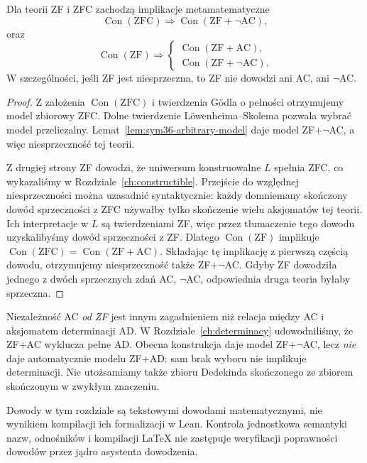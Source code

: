 \begin{twierdzenie}
\label{thm:sym36-relative-consistency}
Dla teorii ZF i ZFC zachodzą implikacje
metamatematyczne
\[
 \operatorname{Con}(\mathrm{ZFC})
 \Longrightarrow
 \operatorname{Con}(\mathrm{ZF}+\neg\mathrm{AC}),
\]
oraz
\[
 \operatorname{Con}(\mathrm{ZF})
 \Longrightarrow
 \begin{cases}
 \operatorname{Con}(\mathrm{ZF}+\mathrm{AC}),\\
 \operatorname{Con}(\mathrm{ZF}+\neg\mathrm{AC}).
 \end{cases}
\]
W szczególności, jeśli ZF jest niesprzeczna,
to ZF nie dowodzi ani AC, ani $\neg$AC.
\end{twierdzenie}
\begin{proof}
Z założenia $\operatorname{Con}(\mathrm{ZFC})$
i twierdzenia Gödla o pełności otrzymujemy
model zbiorowy ZFC. Dolne twierdzenie
Löwenheima--Skolema pozwala wybrać model
przeliczalny. Lemat~\ref{lem:sym36-arbitrary-model}
daje model ZF+$\neg$AC, a więc
niesprzeczność tej teorii.

Z drugiej strony ZF dowodzi, że
uniwersum konstruowalne $L$
spełnia ZFC, co wykazaliśmy w
Rozdziale~\ref{ch:constructible}.
Przejście do względnej niesprzeczności
można uzasadnić syntaktycznie:
każdy domniemany skończony dowód
sprzeczności z ZFC używałby tylko
skończenie wielu aksjomatów tej teorii.
Ich interpretacje w $L$ są twierdzeniami
ZF, więc przez tłumaczenie tego dowodu
uzyskalibyśmy dowód sprzeczności z ZF.
Dlatego $\operatorname{Con}(\mathrm{ZF})$
implikuje
$\operatorname{Con}(\mathrm{ZFC})
=\operatorname{Con}(\mathrm{ZF}+\mathrm{AC})$.
Składając tę implikację z
pierwszą częścią dowodu, otrzymujemy
niesprzeczność także ZF+$\neg$AC.
Gdyby ZF dowodziła jednego z dwóch
sprzecznych zdań AC, $\neg$AC,
odpowiednia druga teoria byłaby sprzeczna.
\end{proof}

\begin{uwaga}
\label{rem:sym36-ac-ad}
Niezależność AC \emph{od ZF} jest innym
zagadnieniem niż relacja między AC i
aksjomatem determinacji AD.
W Rozdziale~\ref{ch:determinacy}
udowodniliśmy, że ZF+AC wyklucza
pełne AD. Obecna konstrukcja daje
model ZF+$\neg$AC, lecz \emph{nie}
daje automatycznie modelu ZF+AD:
sam brak wyboru nie implikuje determinacji.
Nie utożsamiamy także zbioru Dedekinda
skończonego ze zbiorem skończonym
w zwykłym znaczeniu.
\end{uwaga}

\begin{uwaga}
\label{rem:sym36-formal-status}
Dowody w tym rozdziale są tekstowymi
dowodami matematycznymi, nie wynikiem
kompilacji ich formalizacji w Lean.
Kontrola jednostkowa semantyki nazw,
odnośników i kompilacji LaTeX nie zastępuje
weryfikacji poprawności dowodów przez
jądro asystenta dowodzenia.
\end{uwaga}
